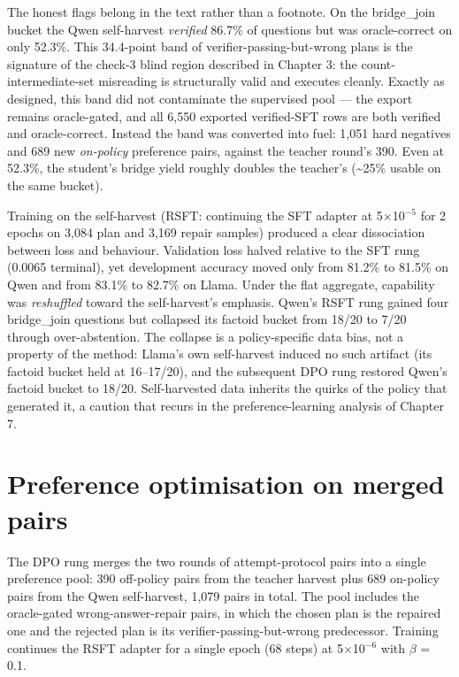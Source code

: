 \documentclass[10pt]{article} %
\begin{document}
The honest flags belong in the text rather than a footnote. On the bridge\_join bucket the Qwen
self-harvest \emph{verified} 86.7\% of questions but was oracle-correct on only 52.3\%. This
34.4-point band of verifier-passing-but-wrong plans is the signature of the check-3 blind
region described in Chapter 3: the count-intermediate-set misreading is structurally valid and
executes cleanly. Exactly as designed, this band did not contaminate the supervised pool --- the
export remains oracle-gated, and all 6,550 exported verified-SFT rows are both verified and
oracle-correct. Instead the band was converted into fuel: 1,051 hard negatives and 689 new
\emph{on-policy} preference pairs, against the teacher round's 390. Even at 52.3\%, the student's
bridge yield roughly doubles the teacher's (\textasciitilde{}25\% usable on the same bucket).

Training on the self-harvest (RSFT: continuing the SFT adapter at 5$\times$10$^{-5}$ for 2 epochs on
3,084 plan and 3,169 repair samples) produced a clear dissociation between loss and behaviour.
Validation loss halved relative to the SFT rung (0.0065 terminal), yet development accuracy
moved only from 81.2\% to 81.5\% on Qwen and from 83.1\% to 82.7\% on Llama. Under the flat
aggregate, capability was \emph{reshuffled} toward the self-harvest's emphasis. Qwen's RSFT rung
gained four bridge\_join questions but collapsed its factoid bucket from 18/20 to 7/20 through
over-abstention. The collapse is a policy-specific data bias, not a property of the method:
Llama's own self-harvest induced no such artifact (its factoid bucket held at 16--17/20), and
the subsequent DPO rung restored Qwen's factoid bucket to 18/20. Self-harvested data inherits
the quirks of the policy that generated it, a caution that recurs in the preference-learning
analysis of Chapter 7.

\section{Preference optimisation on merged pairs}\label{sec:preference-optimisation-on-merged-pairs}

The DPO rung merges the two rounds of attempt-protocol pairs into a single preference pool:
390 off-policy pairs from the teacher harvest plus 689 on-policy pairs from the Qwen
self-harvest, 1,079 pairs in total. The pool includes the oracle-gated wrong-answer-repair
pairs, in which the chosen plan is the repaired one and the rejected plan is its
verifier-passing-but-wrong predecessor. Training continues the RSFT adapter for a single epoch
(68 steps) at 5$\times$10$^{-6}$ with $\beta$ = 0.1.
\end{document}
